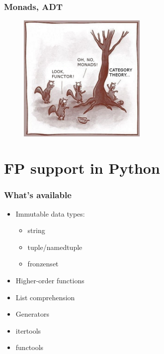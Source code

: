 \documentclass[18pt, compress, aspectratio=169]{beamer}
\begin{document}
\begin{frame}
    \frametitle{Monads, ADT}
    \vspace{-30pt}
    \begin{figure}
        \includegraphics[width=0.55\textwidth,center]{squirells.png}
    \end{figure}
\end{frame}

\section{FP support in Python}

\begin{frame}
    \frametitle{What's available}
    \vspace{-25pt}
    \begin{itemize}[label={\MVRightarrow}]
        \item <+->Immutable data types:
            \begin{itemize}
                \item string
                \item tuple/namedtuple
                \item fronzenset
            \end{itemize}
        \item <+->Higher-order functions
        \item <+->List comprehension
        \item <+->Generators
        \item <+->itertools
        \item <+->functools
    \end{itemize}
\end{frame}
\end{document}
